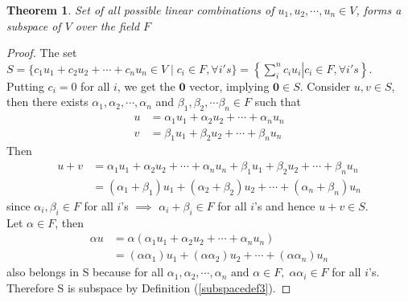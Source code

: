 \documentclass[a4paper, titlepage]{article}
\newtheorem{theorem}{Theorem}[section]
\begin{document}
    \begin{theorem}
        \label{lctheorem1}
        Set of all possible linear combinations of 
        $u_1, u_2, \cdots, u_n \in V$, forms a subspace of $V$ over 
        the field $F$
    \end{theorem}
    \begin{proof}
        The set $S = \{ c_1u_1 + c_2u_2 + \cdots + c_nu_n \in V \; \vert \; c_i \in F, \forall i's \}
        = \left\{ \displaystyle\sum_i^n c_iu_i \left. \right\vert c_i \in F, \forall i's \right\} $. \hfill \\
        Putting $c_i = 0$ for all $i$, we get the $\bm{0}$ vector, implying
        $\bm{0} \in S$. Consider $u, v \in S$, then there exists 
        $\alpha_1, \alpha_2, \cdots, \alpha_n$ and $\beta_1, \beta_2, 
        \cdots \beta_n \in F$ such that
        \begin{align*}
            u &= \alpha_1u_1 + \alpha_2u_2 + \cdots + \alpha_nu_n \\
            v &= \beta_1u_1 + \beta_2u_2 + \cdots + \beta_nu_n
        \end{align*}
        Then
        \begin{align*}
            u + v &= \alpha_1u_1 + \alpha_2u_2 + \cdots + \alpha_nu_n
                    +
                    \beta_1u_1 + \beta_2u_2 + \cdots + \beta_nu_n \\
                  &= (\alpha_1 + \beta_1)u_1 + (\alpha_2 + \beta_2)u_2
                     + \cdots +
                     (\alpha_n + \beta_n)u_n
        \end{align*}
        since $\alpha_i, \beta_i \in F$ for all $i$'s $\implies$ 
        $\alpha_i + \beta_i \in F$ for all $i$'s and hence $u + v
        \in S$. \\
        Let $\alpha \in F$, then 
        \begin{align*}
            \alpha u &= \alpha(\alpha_1u_1 + \alpha_2u_2 + \cdots + \alpha_nu_n) \\
                     &= (\alpha\alpha_1)u_1 + (\alpha\alpha_2)u_2 + \cdots + (\alpha\alpha_n)u_n
        \end{align*}
        also belongs in S because for all $\alpha_1, \alpha_2, \cdots, 
        \alpha_n \text{ and } \alpha \in F, \; \alpha\alpha_i \in F$ 
        for all $i$'s. \\
        Therefore S is subspace by Definition (\ref{subspacedef3}).
    \end{proof}
\end{document}
